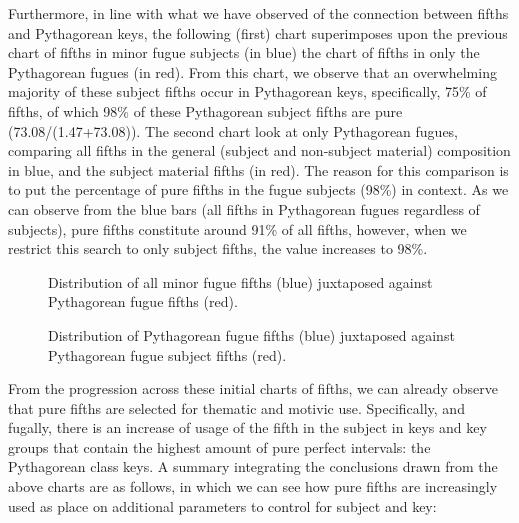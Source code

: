 Furthermore, in line with what we have observed of the connection
between fifths and Pythagorean keys, the following (first) chart
superimposes upon the previous chart of fifths in minor fugue subjects
(in blue) the chart of fifths in only the Pythagorean fugues (in red).
From this chart, we observe that an overwhelming majority of these
subject fifths occur in Pythagorean keys, specifically, 75\% of fifths,
of which 98\% of these Pythagorean subject fifths are pure
(73.08/(1.47+73.08)). The second chart look at only Pythagorean fugues,
comparing all fifths in the general (subject and non-subject material)
composition in blue, and the subject material fifths (in red). The
reason for this comparison is to put the percentage of pure fifths in
the fugue subjects (98\%) in context. As we can observe from the blue
bars (all fifths in Pythagorean fugues regardless of subjects), pure
fifths constitute around 91\% of all fifths, however, when we restrict
this search to only subject fifths, the value increases to 98\%.




\begin{figure}[H]
\vspace{1.5em}
    \centering
    \caption[Distribution of all minor fugue fifths juxtaposed against Pythagorean fugue fifths. ]{Distribution of all minor fugue fifths (blue) juxtaposed against Pythagorean fugue fifths (red).}
\end{figure}


\begin{figure}[H]
\vspace{1.5em}
    \centering
    \caption[Distribution of Pythagorean fugue fifths juxtaposed against Pythagorean fugue subject fifths. ]{Distribution of Pythagorean fugue fifths (blue) juxtaposed against Pythagorean fugue subject fifths (red).}
\end{figure}
    From the progression across these initial charts of fifths, we can
already observe that pure fifths are selected for thematic and motivic
use. Specifically, and fugally, there is an increase of usage of the
fifth in the subject in keys and key groups that contain the highest
amount of pure perfect intervals: the Pythagorean class keys. A summary
integrating the conclusions drawn from the above charts are as follows,
in which we can see how pure fifths are increasingly used as place on
additional parameters to control for subject and key:

